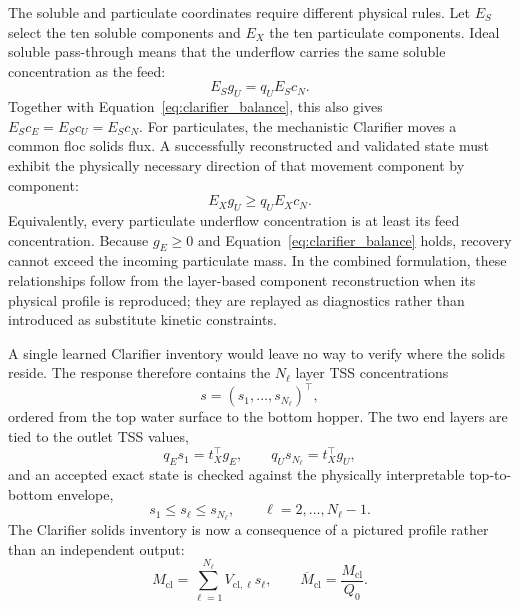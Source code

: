 \documentclass[a4paper,fleqn]{cas-sc}
\begin{document}
The soluble and particulate coordinates require different physical rules. Let $E_S$ select the ten soluble components and $E_X$ the ten particulate components. Ideal soluble pass-through means that the underflow carries the same soluble concentration as the feed:
\begin{equation}
\label{eq:soluble_passthrough}
E_Sg_U=q_UE_Sc_N.
\end{equation}
Together with Equation~\eqref{eq:clarifier_balance}, this also gives $E_Sc_E=E_Sc_U=E_Sc_N$. For particulates, the mechanistic Clarifier moves a common floc solids flux. A successfully reconstructed and validated state must exhibit the physically necessary direction of that movement component by component:
\begin{equation}
\label{eq:particulate_densification}
E_Xg_U\geq q_UE_Xc_N.
\end{equation}
Equivalently, every particulate underflow concentration is at least its feed concentration. Because $g_E\geq0$ and Equation~\eqref{eq:clarifier_balance} holds, recovery cannot exceed the incoming particulate mass. In the combined formulation, these relationships follow from the layer-based component reconstruction when its physical profile is reproduced; they are replayed as diagnostics rather than introduced as substitute kinetic constraints.

A single learned Clarifier inventory would leave no way to verify where the solids reside. The response therefore contains the $N_\ell$ layer TSS concentrations
\begin{equation}
\label{eq:clarifier_layer_vector}
s=(s_1,\ldots,s_{N_\ell})^\top,
\end{equation}
ordered from the top water surface to the bottom hopper. The two end layers are tied to the outlet TSS values,
\begin{equation}
\label{eq:clarifier_endpoint_tss}
q_Es_1=t_X^\top g_E,
\qquad
q_Us_{N_\ell}=t_X^\top g_U,
\end{equation}
and an accepted exact state is checked against the physically interpretable top-to-bottom envelope,
\begin{equation}
\label{eq:clarifier_layer_envelope}
s_1\leq s_\ell\leq s_{N_\ell},
\qquad \ell=2,\ldots,N_\ell-1.
\end{equation}
The Clarifier solids inventory is now a consequence of a pictured profile rather than an independent output:
\begin{equation}
\label{eq:clarifier_inventory}
M_{\mathrm{cl}}=\sum_{\ell=1}^{N_\ell}V_{\mathrm{cl},\ell}s_\ell,
\qquad
\overline M_{\mathrm{cl}}=\frac{M_{\mathrm{cl}}}{Q_0}.
\end{equation}
\end{document}

